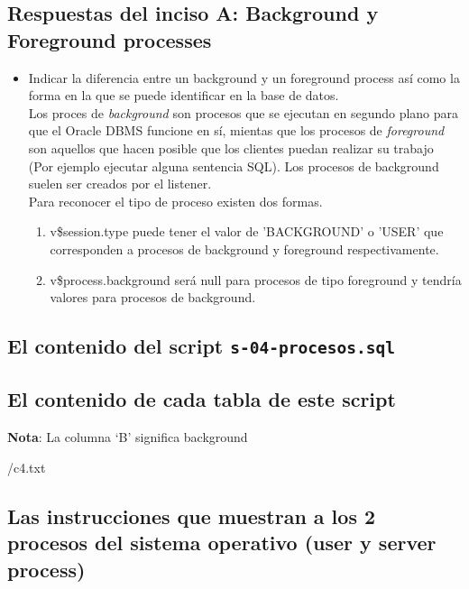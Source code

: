 \documentclass{article}
\begin{document}
\subsection*{Respuestas del inciso A: Background y Foreground processes}

\begin{itemize}
  \item Indicar la diferencia entre un background y un foreground process así
    como la forma en la que se puede identificar en la base de datos. \\[3mm]
    Los proces de \textit{background} son procesos que se ejecutan en segundo
    plano para que el Oracle DBMS funcione en sí, mientas que los procesos de
    \textit{foreground} son aquellos que hacen posible que los clientes puedan
    realizar su trabajo (Por ejemplo ejecutar alguna sentencia SQL).
    Los procesos de background suelen ser creados por el listener.\\

    Para reconocer el tipo de proceso existen dos formas. 
    \begin{enumerate}
      \item v\$session.type puede tener el valor de 'BACKGROUND' o 'USER' que
        corresponden a procesos de background y foreground respectivamente.
      \item v\$process.background será null para procesos de tipo foreground y
        tendría valores para procesos de background.
    \end{enumerate}

\end{itemize}

\subsection*{El contenido del script \texttt{s-04-procesos.sql} }



\subsection*{El contenido de cada tabla de este script}

\textbf{Nota}: La columna `B' significa background

  {\codedir/c4.txt}

\subsection*{Las instrucciones que muestran a los 2 procesos del sistema 
  operativo (user y server process)}
\end{document}
